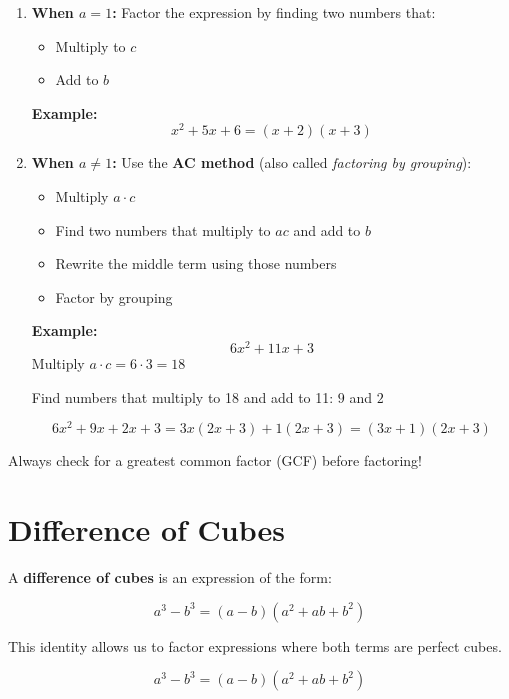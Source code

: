 \documentclass[11pt]{article}
\begin{document}
\begin{enumerate}
  \item \textbf{When \( a = 1 \):}
  Factor the expression by finding two numbers that:
  \begin{itemize}
    \item Multiply to \( c \)
    \item Add to \( b \)
  \end{itemize}

  \textbf{Example:}
  \[
  x^2 + 5x + 6 = (x + 2)(x + 3)
  \]

  \item \textbf{When \( a \neq 1 \):}
  Use the \textbf{AC method} (also called \emph{factoring by grouping}):
  \begin{itemize}
    \item Multiply \( a \cdot c \)
    \item Find two numbers that multiply to \( ac \) and add to \( b \)
    \item Rewrite the middle term using those numbers
    \item Factor by grouping
  \end{itemize}

  \textbf{Example:}
  \[
  6x^2 + 11x + 3
  \]
  Multiply \( a \cdot c = 6 \cdot 3 = 18 \)

  Find numbers that multiply to 18 and add to 11: \( 9 \) and \( 2 \)

  \[
  6x^2 + 9x + 2x + 3 = 3x(2x + 3) + 1(2x + 3) = (3x + 1)(2x + 3)
  \]
\end{enumerate}

\begin{tcolorbox}[colback=blue!5!white, colframe=blue!80!black, title=Key Tip]
Always check for a greatest common factor (GCF) before factoring!
\end{tcolorbox}

\section{Difference of Cubes}

A \textbf{difference of cubes} is an expression of the form:

\[
a^3 - b^3 = (a - b)(a^2 + ab + b^2)
\]

This identity allows us to factor expressions where both terms are perfect cubes.

\begin{tcolorbox}[colback=blue!5!white, colframe=blue!80!black, title=Key Formula]
\[
a^3 - b^3 = (a - b)(a^2 + ab + b^2)
\]
\end{tcolorbox}
\end{document}
